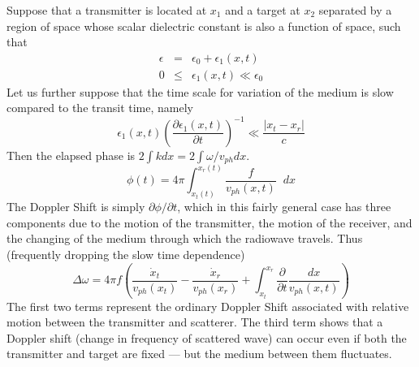 Suppose that a transmitter is located at $x_1$ and a target at $x_2$
separated by a region of space whose scalar dielectric constant is
also a function of space, such that
\begin{eqnarray*}
\epsilon &=& \epsilon_0 + \epsilon_1(x,t) \\
0 &\le& \epsilon_1(x,t)  \ll \epsilon_0
\end{eqnarray*}
Let us further suppose that the time scale for variation of the medium
is slow compared to the transit time, namely
\begin{displaymath}
\epsilon_1(x,t) \left(\frac{\partial \epsilon_1(x,t)}{\partial t}\right)^{-1}
\ll \frac{|x_t - x_r|}{c}
\end{displaymath}
Then the elapsed phase is $2\int k dx = 2\int \omega/v_{ph} dx$.
\begin{displaymath}
\phi(t) = 4\pi \int_{x_t(t)}^{x_r(t)} \frac{f}{v_{ph}(x,t)} \;\; dx
\end{displaymath}
The Doppler Shift is simply $\partial \phi/\partial t$, which in this
fairly general case has three components due to the motion of the
transmitter, the motion of the receiver, and the changing of the
medium through which the radiowave travels.  Thus (frequently dropping
the slow time dependence)
\begin{displaymath}
\Delta \omega =  4\pi f\left(
\frac{\dot{x}_t}{v_{ph}(x_t)} - \frac{\dot{x}_r}{v_{ph}(x_r)} +
\int_{x_t}^{x_r} \frac{\partial}{\partial t}
\frac{dx}{v_{ph}(x,t)}
\right)
\end{displaymath}
The first two terms represent the ordinary Doppler Shift associated
with relative motion between the transmitter and scatterer.  The third
term shows that a Doppler shift (change in frequency of scattered wave)
can occur even if both the transmitter and target are fixed --- but
the medium between them fluctuates.
